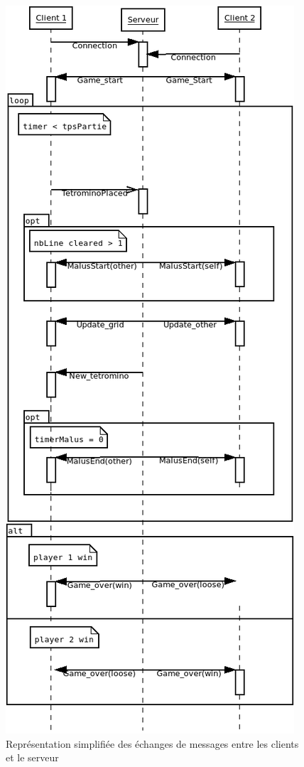 \documentclass[a4paper, 12pt]{article}
\begin{document}
			\begin{figure}[bt]
				\centering
				\includegraphics[scale=0.45]{img/echanges.png}
				\caption{Représentation simplifiée des échanges de messages entre les clients et le serveur}
				\label{fig:rezo}
			\end{figure}
\end{document}
